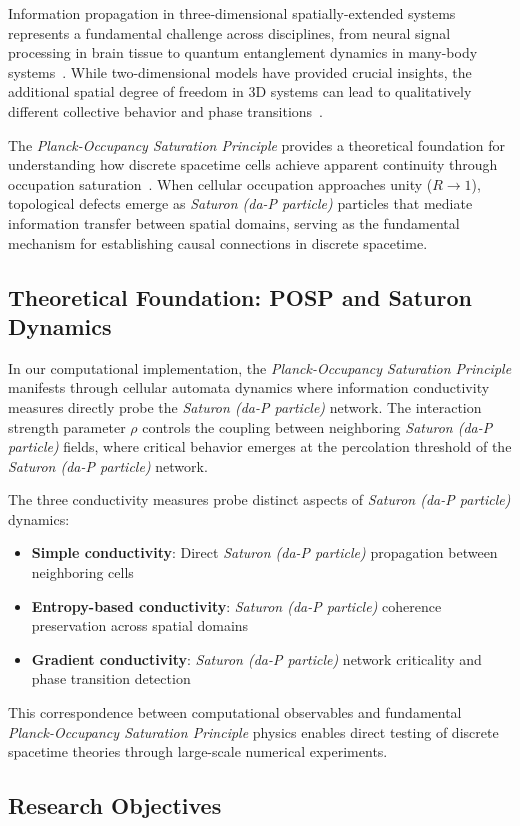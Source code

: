 \documentclass[twocolumn,showpacs,preprintnumbers,amsmath,amssymb,prb]{revtex4-2}
\newcommand{\saturon}{\textit{Saturon (da-P particle)}}
\newcommand{\posp}{\textit{Planck-Occupancy Saturation Principle}}
\begin{document}
Information propagation in three-dimensional spatially-extended systems represents a fundamental challenge across disciplines, from neural signal processing in brain tissue to quantum entanglement dynamics in many-body systems~\cite{nielsen2010quantum}. While two-dimensional models have provided crucial insights, the additional spatial degree of freedom in 3D systems can lead to qualitatively different collective behavior and phase transitions~\cite{wolfram2002new}.

The \posp{} provides a theoretical foundation for understanding how discrete spacetime cells achieve apparent continuity through occupation saturation~\cite{wheeler1957spacetime}. When cellular occupation approaches unity ($R \rightarrow 1$), topological defects emerge as \saturon{} particles that mediate information transfer between spatial domains, serving as the fundamental mechanism for establishing causal connections in discrete spacetime.

\subsection{Theoretical Foundation: POSP and Saturon Dynamics}

In our computational implementation, the \posp{} manifests through cellular automata dynamics where information conductivity measures directly probe the \saturon{} network. The interaction strength parameter $\rho$ controls the coupling between neighboring \saturon{} fields, where critical behavior emerges at the percolation threshold of the \saturon{} network.

The three conductivity measures probe distinct aspects of \saturon{} dynamics:
\begin{itemize}
\item \textbf{Simple conductivity}: Direct \saturon{} propagation between neighboring cells
\item \textbf{Entropy-based conductivity}: \saturon{} coherence preservation across spatial domains  
\item \textbf{Gradient conductivity}: \saturon{} network criticality and phase transition detection
\end{itemize}

This correspondence between computational observables and fundamental \posp{} physics enables direct testing of discrete spacetime theories through large-scale numerical experiments.

\subsection{Research Objectives}
\end{document}
